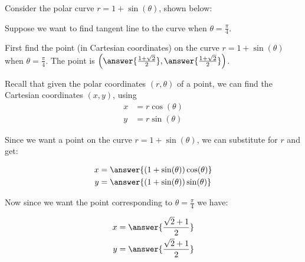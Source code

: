 \documentclass{ximera}
\author{Jason Miller}
\begin{document}
\begin{exercise}


Consider the polar curve $r=1+\sin(\theta)$, shown below: 

\begin{image}  
\end{image} 

Suppose we want to find tangent line to the curve when $\theta=\frac{\pi}{4}$. 

First find the point (in Cartesian coordinates) on the curve $r=1+\sin(\theta)$ when $\theta=\frac{\pi}{4}$. 
The point is $\left( \answer{ \frac{1+\sqrt{2}}{2}},  \answer{ \frac{1+\sqrt{2}}{2}} \right)$. 

\begin{hint}

Recall that given the polar coordinates $(r,\theta)$ of a point, we can find the Cartesian coordinates $(x, y)$, using
\begin{align*}
x&=r\cos(\theta) \\
y&=r\sin(\theta)
\end{align*}

Since we want a point on the curve $r=1+\sin(\theta)$, we can substitute for $r$ and get:

\begin{align*}
x&=\answer{(1+\sin(\theta))\cos(\theta)} \\
y&=\answer{(1+\sin(\theta))\sin(\theta) }
\end{align*}

Now since we want the point corresponding to $\theta=\frac{\pi}{4}$ we have:


\begin{align*}
x&=\answer{ \frac{\sqrt{2}+1}{2} } \\
y&=\answer{\frac{\sqrt{2}+1}{2}  }
\end{align*}


\end{hint}
\end{exercise}
\end{document}
